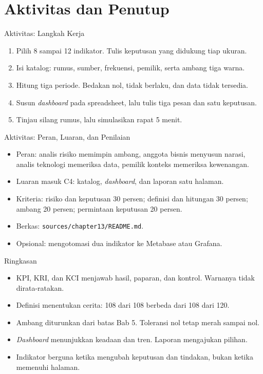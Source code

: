 \documentclass[aspectratio=169, table, 12pt]{beamer}
\begin{document}
\section{Aktivitas dan Penutup}

\begin{frame}{{\Large Aktivitas: Langkah Kerja}}
  \vspace{4pt}
  \small
  \begin{enumerate}
    \item Pilih 8 sampai 12 indikator. Tulis keputusan yang didukung tiap ukuran.
    \item Isi katalog: rumus, sumber, frekuensi, pemilik, serta ambang tiga warna.
    \item Hitung tiga periode. Bedakan nol, tidak berlaku, dan data tidak tersedia.
    \item Susun \textit{dashboard} pada spreadsheet, lalu tulis tiga pesan dan satu keputusan.
    \item Tinjau silang rumus, lalu simulasikan rapat 5 menit.
  \end{enumerate}
\end{frame}

\begin{frame}{{\Large Aktivitas: Peran, Luaran, dan Penilaian}}
  \vspace{6pt}
  \small
  \begin{itemize}
    \item Peran: analis risiko memimpin ambang, anggota bisnis menyusun narasi, analis teknologi
          memeriksa data, pemilik konteks memeriksa kewenangan.
    \item Luaran masuk C4: katalog, \textit{dashboard}, dan laporan satu halaman.
    \item Kriteria: risiko dan keputusan 30 persen; definisi dan hitungan 30 persen; ambang 20
          persen; permintaan keputusan 20 persen.
    \item Berkas: \texttt{sources/chapter13/README.md}.
    \item Opsional: mengotomasi dua indikator ke Metabase atau Grafana.
  \end{itemize}
\end{frame}

\begin{frame}{{\Large Ringkasan}}
  \vspace{6pt}
  \small
  \begin{itemize}
    \item KPI, KRI, dan KCI menjawab hasil, paparan, dan kontrol. Warnanya tidak dirata-ratakan.
    \item Definisi menentukan cerita: 108 dari 108 berbeda dari 108 dari 120.
    \item Ambang diturunkan dari batas Bab 5. Toleransi nol tetap merah sampai nol.
    \item \textit{Dashboard} menunjukkan keadaan dan tren. Laporan mengajukan pilihan.
    \item Indikator berguna ketika mengubah keputusan dan tindakan, bukan ketika memenuhi halaman.
  \end{itemize}
\end{frame}
\end{document}
